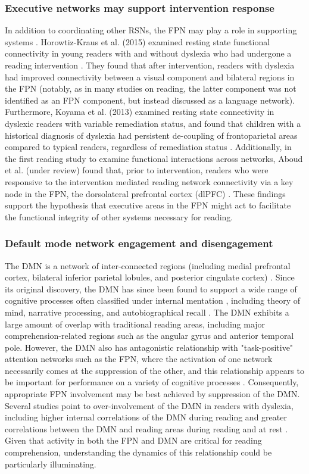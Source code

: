 \subsubsection{Executive networks may support intervention response}
In addition to coordinating other RSNs, the FPN may play a role in supporting systems \cite{Cole2015}. Horowtiz-Kraus et al. (2015) examined resting state functional connectivity in young readers with and without dyslexia who had undergone a reading intervention \cite{HorowitzKraus2015}. They found that after intervention, readers with dyslexia had improved connectivity between a visual component and bilateral regions in the FPN (notably, as in many studies on reading, the latter component was not identified as an FPN component, but instead discussed as a language network). Furthermore, Koyama et al. (2013) examined resting state connectivity in dyslexic readers with variable remediation status, and found that children with a historical diagnosis of dyslexia had persistent de-coupling of frontoparietal areas compared to typical readers, regardless of remediation status \cite{Koyama2013}. Additionally, in the first reading study to examine functional interactions across networks, Aboud et al. (under review) found that, prior to intervention, readers who were responsive to the intervention mediated reading network connectivity via a key node in the FPN, the dorsolateral prefrontal cortex (dlPFC) \cite{Aboud2017_NF}. These findings support the hypothesis that executive areas in the FPN might act to facilitate the functional integrity of other systems necessary for reading.


\subsubsection{Default mode network engagement and disengagement} 
The DMN is a network of inter-connected regions (including medial prefrontal cortex, bilateral inferior parietal lobules, and posterior cingulate cortex) \cite{Shulman1997}. Since its original discovery, the DMN has since been found to support a wide range of cognitive processes often classified under internal mentation \cite{Buckner2008}, including theory of mind, narrative processing, and autobiographical recall \cite{AbdulSabur2014}. The DMN exhibits a large amount of overlap with traditional reading areas, including major comprehension-related regions such as the angular gyrus and anterior temporal pole. However, the DMN also has antagonistic relationship with "task-positive" attention networks such as the FPN, where the activation of one network necessarily comes at the suppression of the other, and this relationship appears to be important for performance on a variety of cognitive processes \cite{Fox2005, Keller2015}. Consequently, appropriate FPN involvement may be best achieved by suppression of the DMN. Several studies point to over-involvement of the DMN in readers with dyslexia, including higher internal correlations of the DMN during reading \cite{Finn2013} and greater correlations between the DMN and reading areas during reading and at rest \cite{Schurz2015}. Given that activity in both the FPN and DMN are critical for reading comprehension, understanding the dynamics of this relationship could be particularly illuminating.

